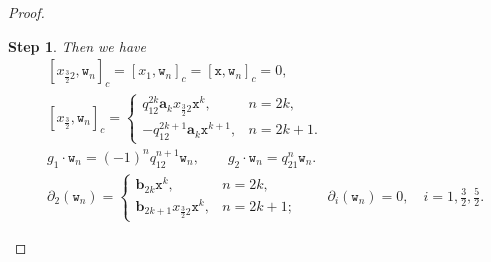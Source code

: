 \documentclass[pdftex]{sigma}
\numberwithin{equation}{section}
\newtheorem{stepiv}{Step}
\newcommand{\ab}{\mathbf a}
\newcommand{\bb}{\mathbf b}
\newcommand{\wt}{\mathtt{w}}
\newcommand{\xt}{\mathtt{x}}
\newcommand{\tresdos}{\frac{3}{2}}
\begin{document}
\begin{proof}
\begin{stepiv}
Then we have
\begin{align}
\label{eq:pale+Jordan-wn-adj-action}
&[x_{\tresdos2},\wt_n]_c= [x_1,\wt_n]_c =[\xt,\wt_n]_c =0,
\\
\label{eq:pale+Jordan-wn-adj-action-2}
&[x_{\tresdos},\wt_n]_c= \begin{cases}
q_{12}^{2k} \ab_k x_{\tresdos2}\xt^{k}, & n=2k, \\
-q_{12}^{2k+1}\ab_k \xt^{k+1}, & n=2k+1.
\end{cases}
\\
\label{eq:pale+Jordan-action-wn}
&g_1\cdot \wt_n =(-1)^n q_{12}^{n+1} \wt_n, \qquad
g_2\cdot \wt_n = q_{21}^{n} \wt_n.
\\
\label{eq:pale+Jordan-derivations-wn}
&\partial_{2}(\wt_n)=\begin{cases}
\bb_{2k} \xt^{k}, & n=2k, \\
\bb_{2k+1} x_{\tresdos2}\xt^{k}, & n=2k+1;
\end{cases} \qquad \partial_{i}(\wt_n) =0, \quad i=1,\tfrac{3}{2},\tfrac{5}{2}.
\end{align}
\end{stepiv}


\end{proof}
\end{document}
